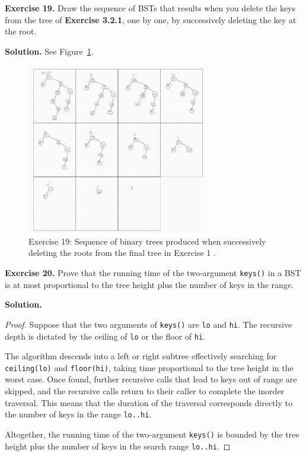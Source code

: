 \documentclass[12pt, a4paper]{article}
\newenvironment{ex}[2][Exercise]
{\par\medskip\noindent \textbf{#1 #2.}}
{\medskip}
\newenvironment{sol}[1][Solution]
{\par\medskip\noindent \textbf{#1.} }
{\medskip}
\begin{document}
	\begin{ex}{19}
		Draw the sequence of BSTs that results when you delete the keys from the tree
		of \textbf{Exercise 3.2.1}, one by one, by successively deleting the key at the
		root.
	\end{ex}
	\begin{sol}
		See Figure~\ref{fig:ex-19}.
		\begin{figure}
			\centering
			\includegraphics[width=0.7\textwidth]{exercise-19}
			\caption{Exercise 19: Sequence of binary trees produced when successively
				deleting the roots from the final tree in Exercise 1 .}
			\label{fig:ex-19}
		\end{figure}
	\end{sol}
	\begin{ex}{20}
		Prove that the running time of the two-argument \texttt{keys()} in a BST
		is at most proportional to the tree height plus the number of keys in the
		range.
	\end{ex}
	\begin{sol}
		\begin{proof}
			Suppose that the two arguments of \texttt{keys()} are \texttt{lo}
			and \texttt{hi}. The recursive depth is dictated by the ceiling
			of \texttt{lo} or the floor of \texttt{hi}.
			
			The algorithm descends into a left or right subtree effectively searching
			for \texttt{ceiling(lo)} and \texttt{floor(hi)}, taking time proportional
			to the tree height in the worst case. Once found, further recursive calls
			that lead to keys out of range are skipped, and the recursive calls return
			to their caller to complete the inorder traversal. This means that the
			duration of the traversal corresponds directly to the number of keys
			in the range \texttt{lo..hi}.
			
			Altogether, the running time of the two-argument \texttt{keys()}
			is bounded by the tree height plus the number of keys in the search
			range \texttt{lo..hi}.
		\end{proof}
	\end{sol}
\end{document}

